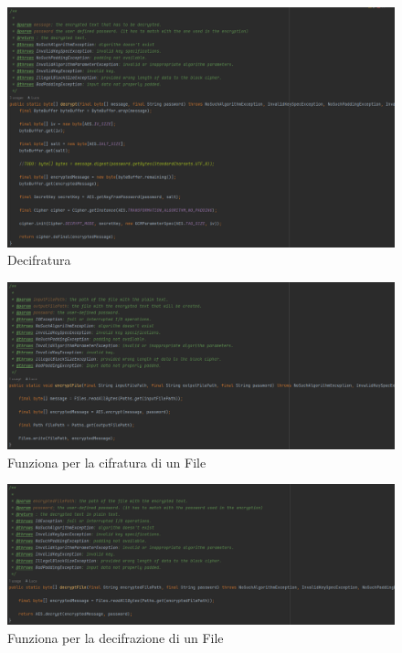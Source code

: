 \textsf{\small } %

\begin{figure}[H]
	\centering
	\includegraphics[width=1\textwidth, height=1\textheight, keepaspectratio]{./images/code/java/decrypt.PNG}
	\caption{Decifratura}
	\label{fig:decrypt_java}
\end{figure}

\textsf{\small } %

\begin{figure}[H]
	\centering
	\includegraphics[width=1\textwidth, height=1\textheight, keepaspectratio]{./images/code/java/encryptFile.PNG}
	\caption{Funziona per la cifratura di un File}
	\label{fig:encryptFile}
\end{figure}

\textsf{\small } %

\begin{figure}[H]
	\centering
	\includegraphics[width=1\textwidth, height=1\textheight, keepaspectratio]{./images/code/java/decryptFile.PNG}
	\caption{Funziona per la decifrazione di un File}
	\label{fig:decryptFile}
\end{figure}

\textsf{\small } %

